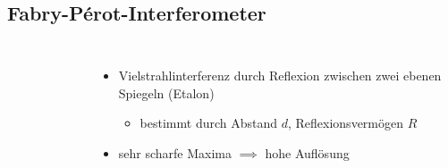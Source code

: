 \documentclass[10pt, aspectratio=169]{beamer}
\begin{document}
\subsection{Fabry-Pérot-Interferometer}
\label{sec:fpi}
\begin{frame}
  \begin{columns}
    \begin{figure}
    \end{figure}
    \begin{itemize}
    \item<1-> Vielstrahlinterferenz durch Reflexion zwischen zwei
      ebenen Spiegeln (Etalon)
      \begin{itemize}
      \item bestimmt durch Abstand \(d\), Reflexionsverm\"ogen \(R\)
      \end{itemize}
    \item<3-> sehr scharfe Maxima \(\implies\) hohe Aufl\"osung
    \end{itemize}
  \end{columns}
\end{frame}
\end{document}
